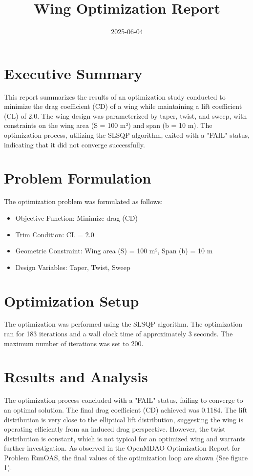 \documentclass{article}
\title{Wing Optimization Report}
\date{2025-06-04}
\begin{document}
\maketitle

\section{Executive Summary}
This report summarizes the results of an optimization study conducted to minimize the drag coefficient (CD) of a wing while maintaining a lift coefficient (CL) of 2.0. The wing design was parameterized by taper, twist, and sweep, with constraints on the wing area (S = 100 m²) and span (b = 10 m). The optimization process, utilizing the SLSQP algorithm, exited with a "FAIL" status, indicating that it did not converge successfully.

\section{Problem Formulation}
The optimization problem was formulated as follows:
\begin{itemize}
    \item Objective Function: Minimize drag (CD)
    \item Trim Condition: CL = 2.0
    \item Geometric Constraint: Wing area (S) = 100 m², Span (b) = 10 m
    \item Design Variables: Taper, Twist, Sweep
\end{itemize}

\section{Optimization Setup}
The optimization was performed using the SLSQP algorithm. The optimization ran for 183 iterations and a wall clock time of approximately 3 seconds. The maximum number of iterations was set to 200.

\section{Results and Analysis}
The optimization process concluded with a "FAIL" status, failing to converge to an optimal solution. The final drag coefficient (CD) achieved was 0.1184. The lift distribution is very close to the elliptical lift distribution, suggesting the wing is operating efficiently from an induced drag perspective. However, the twist distribution is constant, which is not typical for an optimized wing and warrants further investigation. As observed in the OpenMDAO Optimization Report for Problem RunOAS, the final values of the optimization loop are shown (See figure 1).
\end{document}
